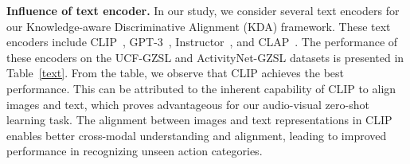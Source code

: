 \documentclass[10pt,twocolumn,letterpaper]{article}
\begin{document}
\begin{table}[t]
    \centering
    \caption{Ablation study: Influence of different .}
    \label{lamda}
\end{table}

\begin{table}[t]
    \centering
    \caption{Ablation study: Influence of different text encoder.}
    \label{text}
\end{table}

\noindent
\textbf{Influence of text encoder.}
In our study, we consider several text encoders for our Knowledge-aware Discriminative Alignment (KDA) framework. These text encoders include CLIP~\cite{clip}, GPT-3~\cite{yang2022empirical}, Instructor~\cite{instructor}, and CLAP~\cite{clap}. The performance of these encoders on the UCF-GZSL and ActivityNet-GZSL datasets is presented in Table~\ref{text}. From the table, we observe that CLIP achieves the best performance. This can be attributed to the inherent capability of CLIP to align images and text, which proves advantageous for our audio-visual zero-shot learning task. The alignment between images and text representations in CLIP enables better cross-modal understanding and alignment, leading to improved performance in recognizing unseen action categories.
\end{document}
